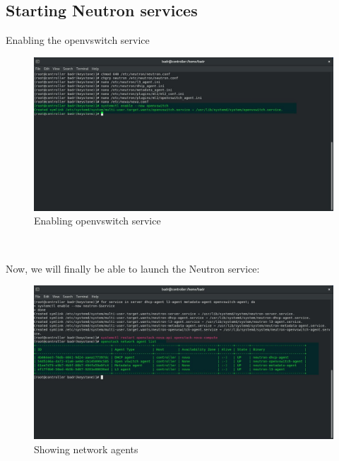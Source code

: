 \begin{spacing}{1.2}
\subsection{Starting Neutron services}
\par Enabling the openvswitch service
\\
\begin{figure}[!htb] 
\begin{center} 
\includegraphics[width=1\linewidth]{Cloud/Installing and Configuring Neutron services/Enabling openvswitch service} 
\end{center} 
\caption{Enabling openvswitch service} 
\end{figure} 
\FloatBarrier
\\

\par Now, we will finally be able to launch the Neutron service: 
\\
\begin{figure}[!htb] 
\begin{center} 
\includegraphics[width=1\linewidth]{Cloud/Installing and Configuring Neutron services/Showing network agents} 
\end{center} 
\caption{Showing network agents} 
\end{figure} 
\FloatBarrier
\\


\end{spacing}
